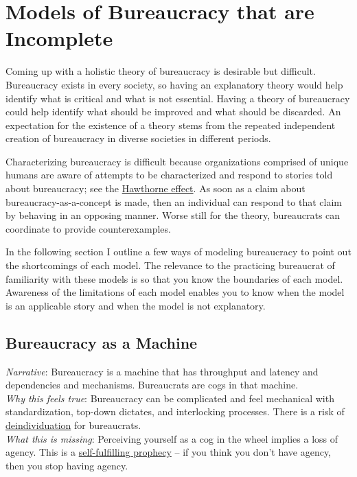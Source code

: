\section{Models of Bureaucracy that are Incomplete\label{sec:models-of-bureaucracy}}

Coming up with a holistic theory of bureaucracy is desirable but difficult. Bureaucracy exists in every society, so having an explanatory theory would help identify what is critical and what is not essential. Having a theory of bureaucracy could help identify what should be improved and what should be discarded. An expectation for the existence of a theory stems from the repeated independent creation of bureaucracy in diverse societies in different periods. 

Characterizing bureaucracy is difficult because organizations comprised of unique humans are aware of attempts to be characterized and respond to stories told about bureaucracy; see the \href{https://en.wikipedia.org/wiki/Hawthorne_effect}{Hawthorne effect}. As soon as a claim about bureaucracy-as-a-concept is made, then an individual can respond to that claim by behaving in an opposing manner. Worse still for the theory, bureaucrats can coordinate to provide counterexamples. 

In the following section I outline a few ways of modeling bureaucracy to point out the shortcomings of each model. The relevance to the practicing bureaucrat of familiarity with these models is so that you know the boundaries of each model. Awareness of the limitations of each model enables you to know when the model is an applicable story and when the model is not explanatory. 

\subsection*{Bureaucracy as a Machine}

\textit{Narrative}: Bureaucracy is a machine that has throughput and latency and dependencies and mechanisms. Bureaucrats are cogs in that machine.\\
\textit{Why this feels true}: Bureaucracy can be complicated and feel mechanical with standardization, top-down dictates, and interlocking processes. There is a risk of \href{https://en.wikipedia.org/wiki/Deindividuation}{deindividuation} for bureaucrats. \\
\textit{What this is missing}: Perceiving yourself as a cog in the wheel implies a loss of agency. This is a \href{https://en.wikipedia.org/wiki/Self-fulfilling_prophecy}{self-fulfilling prophecy} -- if you think you don't have agency, then you stop having agency. 

